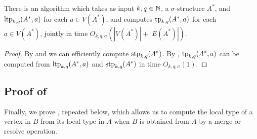\begin{lemma}\label{lem:localglobaltypes-uniform}
    There is an algorithm which takes as input
    \(k,q \in \mathbb N\),
    a $\sigma$-structure \(A^*\),
    and \(\textnormal{ltp}_{k,q}(A^*,a)\) for each \(a\in V(A^*)\),
    and computes
    \(\textnormal{tp}_{k,q}(A^*,a)\) for each $a \in V(A^*)$, jointly
    in time \(O_{k,q,\sigma}(|V(A^*)|+|E(A^*)|)\).
\end{lemma}
\begin{proof}
    By  and 
    we can efficiently compute \(\textnormal{stp}_{k,q}(A^*)\).
    By ,
    \(\textnormal{tp}_{k,q}(A^*,a)\) can be computed from
    \(\textnormal{ltp}_{k,q}(A^*,a)\) and \(\textnormal{stp}_{k,q}(A^*)\)
    in time $O_{k,q,\sigma}(1)$.
\end{proof}

\subsection{Proof of }
Finally, we prove , repeated below, which allows us to compute the local type of a vertex in $B$ from its local type in $A$ when $B$ is obtained from $A$ by a merge or resolve operation.
\computestep*

